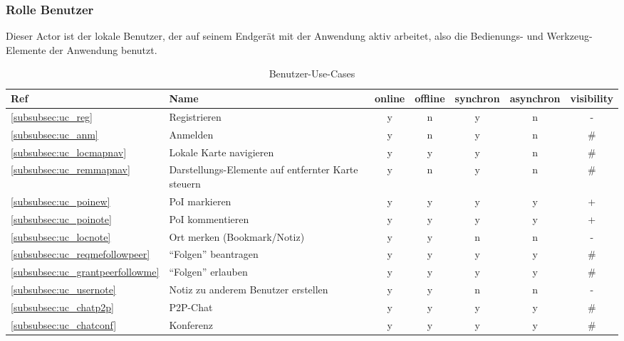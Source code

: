 \subsubsection{Rolle \textbf{Benutzer}}
Dieser Actor ist der lokale Benutzer, der auf seinem Endgerät mit der Anwendung aktiv arbeitet, also die Bedienungs- und Werkzeug-Elemente der Anwendung benutzt.\\
	\begin{table}[H]\label{usecases-benutzer}
		\centering
		\begin{tabulary}{\linewidth}{|>{\centering}m{1cm}|L|C|C|C|C|C|}
		\hline
			\textbf{Ref} & \textbf{Name} & \textbf{online} & \textbf{offline} & \textbf{synchron} & \textbf{asynchron} & \textbf{visibility} \\ \hline
			\ref{subsubsec:uc_reg} & Registrieren & y & n & y & n & - \\ \hline
			\ref{subsubsec:uc_anm} & Anmelden & y & n & y & n & \# \\ \hline
			\ref{subsubsec:uc_locmapnav} & Lokale Karte navigieren & y & y & y & n & \# \\ \hline
			\ref{subsubsec:uc_remmapnav} & Darstellungs-Elemente auf entfernter Karte steuern & y & n & y & n & \# \\ \hline
			\ref{subsubsec:uc_poinew} & PoI markieren & y & y & y & y & + \\ \hline
			\ref{subsubsec:uc_poinote} & PoI kommentieren & y & y & y & y & + \\ \hline
			\ref{subsubsec:uc_locnote} & Ort merken (Bookmark/Notiz) & y & y & n & n & - \\ \hline
			\ref{subsubsec:uc_reqmefollowpeer} & "`Folgen"' beantragen & y & y & y & y & \# \\ \hline
			\ref{subsubsec:uc_grantpeerfollowme} & "`Folgen"' erlauben & y & y & y & y & \# \\ \hline
			\ref{subsubsec:uc_usernote} & Notiz zu anderem Benutzer erstellen & y & y & n & n & - \\ \hline
			\ref{subsubsec:uc_chatp2p} & P2P-Chat & y & y & y & y & \# \\ \hline
			\ref{subsubsec:uc_chatconf} & Konferenz & y & y & y & y & \# \\ \hline
		\end{tabulary}
	\caption{Benutzer-Use-Cases}
	\end{table}
